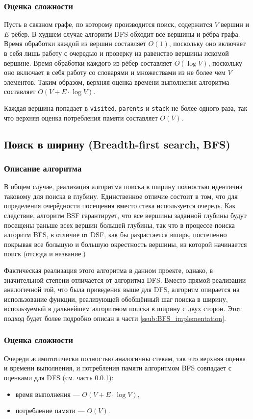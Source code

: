 \documentclass[a4paper, 12pt]{article}
\begin{document}
\subsubsection{Оценка сложности}
\label{ssub:DFS_complexity}
Пусть в связном графе, по которому производится поиск, содержится \({ V }\) вершин и \({ E }\) рёбер. В худшем случае алгоритм DFS обходит все вершины и рёбра графа. Время обработки каждой из вершин составляет \({ O(1) }\), поскольку оно включает в себя лишь работу с очередью и проверку на равенство вершины искомой вершине. Время обработки каждого из рёбер составляет \({ O(\log V) }\), поскольку оно включает в себя работу со словарями и множествами из не более чем \({ V }\) элементов. Таким образом, верхняя оценка времени выполнения алгоритма составляет \({ O(V + E \cdot \log V) }\).

Каждая вершина попадает в \verb|visited|, \verb|parents| и \verb|stack| не более одного раза, так что верхняя оценка потребления памяти составляет \({ O(V) }\).

\subsection{Поиск в ширину (Breadth-first search, BFS)}
\subsubsection{Описание алгоритма}
В общем случае, реализация алгоритма поиска в ширину полностью идентична таковому для поиска в глубину. Единственное отличие состоит в том, что для определения очерёдности посещения вместо стека используется очередь. Как следствие, алгоритм BSF гарантирует, что все  вершины заданной глубины будут посещены раньше всех вершин большей глубины, так что в процессе поиска алгоритм BFS, в отличие от DSF, как бы разрастается вширь, постепенно покрывая все большую и большую окрестность вершины, из которой начинается поиск (отсюда и название.)

Фактическая реализация этого алгоритма в данном проекте, однако, в значительной степени отличается от алгоритма DFS. Вместо прямой реализации аналогичной той, что была приведения выше для DFS, алгоритм опирается на использование функции, реализующей обобщённый шаг поиска в ширину, используемый в дальнейшем алгоритмом поиска в ширину с двух сторон. Этот подход будет более подробно описан в части \ref{ssub:BFS_implementation}.

\subsubsection{Оценка сложности}
Очереди асимптотически полностью аналогичны стекам, так что верхняя оценка и времени выполнения, и потребления памяти алгоритмом BFS совпадает с оценками для DFS (см. часть \ref{ssub:DFS_complexity}):
\begin{itemize}
    \item время выполнения --- \({ O(V + E \cdot \log V) }\),
    \item потребление памяти --- \({ O(V) }\).
\end{itemize}
\end{document}
